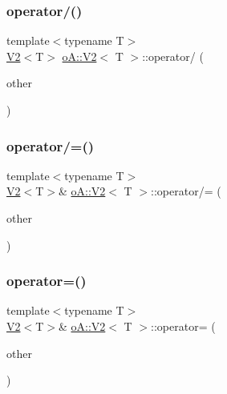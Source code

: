 \mbox{\label{structo_a_1_1_v2_a62fad7a505de2e093da7d9d8a01342c2}} 
\subsubsection{\texorpdfstring{operator/()}{operator/()}}
{\footnotesize\ttfamily template$<$typename T$>$ \\
\mbox{\hyperlink{structo_a_1_1_v2}{V2}}$<$T$>$ \mbox{\hyperlink{structo_a_1_1_v2}{o\+A\+::\+V2}}$<$ T $>$\+::operator/ (\begin{DoxyParamCaption}\item[{const \mbox{\hyperlink{structo_a_1_1_v2}{o\+A\+::\+V2}}$<$ T $>$ \&}]{other }\end{DoxyParamCaption})\hspace{0.3cm}{\ttfamily [inline]}}

\mbox{\label{structo_a_1_1_v2_a9305c1fafa282470c0670119733f346c}} 
\subsubsection{\texorpdfstring{operator/=()}{operator/=()}}
{\footnotesize\ttfamily template$<$typename T$>$ \\
\mbox{\hyperlink{structo_a_1_1_v2}{V2}}$<$T$>$\& \mbox{\hyperlink{structo_a_1_1_v2}{o\+A\+::\+V2}}$<$ T $>$\+::operator/= (\begin{DoxyParamCaption}\item[{const \mbox{\hyperlink{structo_a_1_1_v2}{o\+A\+::\+V2}}$<$ T $>$ \&}]{other }\end{DoxyParamCaption})\hspace{0.3cm}{\ttfamily [inline]}}

\mbox{\label{structo_a_1_1_v2_ac8fc6159c4258a767540f8af7971348b}} 
\subsubsection{\texorpdfstring{operator=()}{operator=()}\hspace{0.1cm}{\footnotesize\ttfamily [1/2]}}
{\footnotesize\ttfamily template$<$typename T$>$ \\
\mbox{\hyperlink{structo_a_1_1_v2}{V2}}$<$T$>$\& \mbox{\hyperlink{structo_a_1_1_v2}{o\+A\+::\+V2}}$<$ T $>$\+::operator= (\begin{DoxyParamCaption}\item[{\mbox{\hyperlink{structo_a_1_1_v2}{o\+A\+::\+V2}}$<$ T $>$ \&\&}]{other }\end{DoxyParamCaption})\hspace{0.3cm}{\ttfamily [inline]}}

